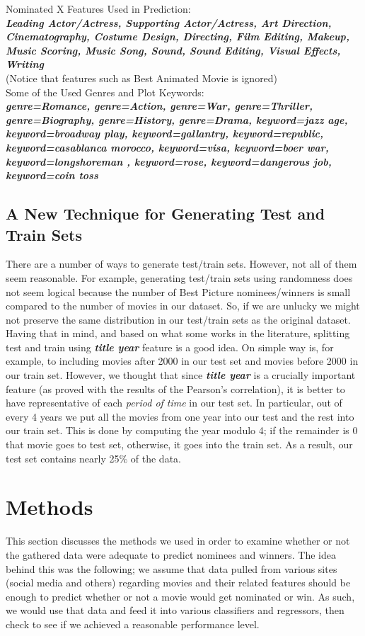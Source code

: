 \documentclass[journal,transmag]{IEEEtran}
\begin{document}
\noindent
Nominated X Features Used in Prediction:\\
\textit{\textbf{Leading Actor/Actress, Supporting	 Actor/Actress, Art Direction, Cinematography, Costume Design, Directing, Film Editing, Makeup,  Music Scoring, Music Song, Sound, Sound Editing, Visual Effects, Writing }}\\ 
(Notice that features such as Best Animated Movie is ignored)\\

\noindent
Some of the Used Genres and Plot Keywords:\\
\textit{\textbf{genre=Romance,	genre=Action,	genre=War,	genre=Thriller,	genre=Biography,	 genre=History,	genre=Drama, keyword=jazz age,	keyword=broadway play,	keyword=gallantry,	keyword=republic,	keyword=casablanca morocco,	keyword=visa,	keyword=boer war,	keyword=longshoreman	, keyword=rose, 	keyword=dangerous job,	keyword=coin toss}}

\subsection{A New Technique for Generating Test and Train Sets} \label{train_test_set}
There are a number of ways to generate test/train sets. However, not all of them seem reasonable. For example, generating test/train sets using randomness does not seem logical because the number of Best Picture nominees/winners is small compared to the number of movies in our dataset. So, if we are unlucky we might not preserve the same distribution in our test/train sets as the original dataset. \\
Having that in mind, and based on what some works in the literature, splitting test and train using \textbf{\textit{title year}} feature is a good idea. On simple way is, for example, to including movies after 2000 in our test set and movies before 2000 in our train set. However, we thought that since \textbf{\textit{title year}} is a crucially important feature (as proved with the results of the Pearson's correlation), it is better to have representative of each \textit{period of time} in our test set. In particular, out of every 4 years we put all the movies from one year into our test and the rest into our train set. This is done by computing the year modulo 4; if the remainder is 0 that movie goes to test set, otherwise, it goes into the train set. As a result, our test set contains nearly 25$\%$ of the data.


	
	
	\section{Methods}
	This section discusses the methods we used in order to examine whether or not the gathered data were adequate to predict nominees and winners. The idea behind this was the following; we assume that data pulled from various sites (social media and others) regarding movies and their related features should be enough to predict whether or not a movie would get nominated or win. As such, we would use that data and feed it into various classifiers and regressors, then check to see if we achieved a reasonable performance level.
	
\end{document}
